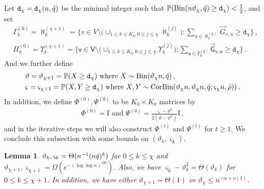 \documentclass[11pt]{article}
\newtheorem{Lemma}[Theorem]{Lemma}
\numberwithin{equation}{section}
\begin{document}
Let $\mathtt{d}_{\chi}=\mathtt{d}_{\chi}(n,\Hat{q})$ be the minimal integer such that $\mathbb{P}( \mathrm{Bin}(n \vartheta_{\chi}, \Hat{q}) \geq \mathtt{d}_{\chi} ) < \frac{1}{2}$, and set 
\begin{equation}
\begin{aligned}
    & \Gamma^{(0)}_k = \aleph^{(\chi+1)}_k = \Big\{ v \in V \setminus \big( \cup_{1 \leq k \leq K_0, 0 \leq j \leq \chi} \aleph^{(j)}_k \big) : \sum_{u \in \aleph^{(\chi)}_k} \overrightarrow{G}_{v,u} \geq \mathtt{d}_{\chi} \Big\} \,,  \\
    & \Pi^{(0)}_k = \Upsilon^{(\chi+1)}_k = \Big\{ \mathsf{v} \in \mathsf{V} \setminus \big( \cup_{1 \leq k \leq K_0, 0 \leq j \leq \chi} \Upsilon^{(j)}_k \big) : \sum_{\mathsf{u} \in \Upsilon^{(\chi)}_k}  \overrightarrow{\mathsf{G}}_{\mathsf{v},\mathsf{u}} \geq \mathtt{d}_{\chi} \Big\} \,.
    \label{equ-def-initial-set}
\end{aligned}
\end{equation}
And we further define
\begin{equation}
\begin{aligned}
    & \vartheta = \vartheta_{\chi+1} = \mathbb{P}( X \geq \mathtt{d}_{\chi}) \mbox{ where } X \sim \mathrm{Bin}(\vartheta_{\chi}n,\Hat{q})  \,,  \\ 
    & \varsigma = \varsigma_{\chi+1} = \mathbb{P} ( X,Y \geq \mathtt{d}_{\chi}) \mbox{ where } X,Y \sim \mathrm{CorBin} (\vartheta_{\chi}n, \vartheta_{\chi}n, \Hat{q}; \varsigma_{\chi}n, \Hat{\rho}) )\,. \label{equ-def-vartheta-varsigma}
\end{aligned}
\end{equation}
In addition, we define $\Phi^{(0)}, \Psi^{(0)}$ to be $K_0 \times K_0$ matrices by
\begin{align}
    \Phi^{(0)} = \mathrm{I} \mbox{ and }
    \Psi^{(0)} = \frac{\varsigma-\vartheta^2} {2(\vartheta-\vartheta^2)} \mathrm{I}\,,
    \label{equ-initial-matrix}
\end{align}
and in the iterative steps we will also construct $\Phi^{(t)}$ and $\Psi^{(t)}$ for $t \geq 1$.
We conclude this subsection with some bounds on $(\vartheta_k, \varsigma_k)$.
\begin{Lemma}
\label{lemma-property-vartheta-varsigma}
 $\vartheta_k,\varsigma_k = \Theta( n^{-1} (n\Hat{q})^{k} )$ for $0 \leq k \leq \chi$ and $\vartheta_{\chi+1},\varsigma_{\chi+1} = \Omega( e^{- (\log \log n)^{100}} )$. Also, we have $\varsigma_k -\vartheta_k^2 = \Theta(\vartheta_k)$ for $0 \leq k \leq \chi+1$. In addition, we have either $\vartheta_{\chi+1} = \Theta(1)$ or $\vartheta_{\chi} \leq n^{-\alpha+o(1)}$.
\end{Lemma}
\end{document}
